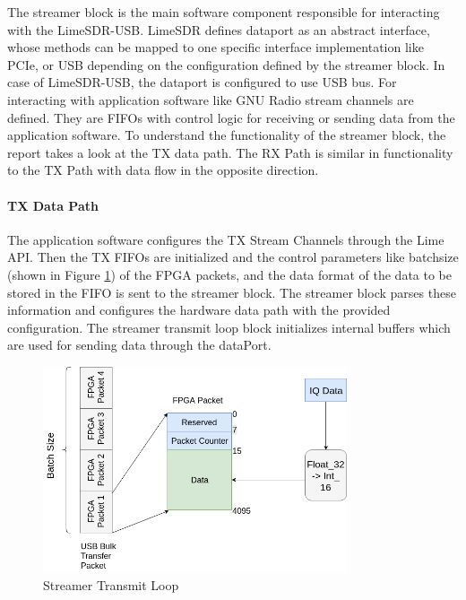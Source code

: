 The streamer block is the main software component responsible for interacting with the LimeSDR-USB.
LimeSDR defines dataport as an abstract interface, whose methods can be mapped to one specific interface implementation like \ac{PCIe}, or USB depending on the configuration defined by the streamer block.
In case of LimeSDR-USB, the dataport is configured to use \ac{USB} bus.
For interacting with application software like GNU Radio stream channels are defined.
They are FIFOs with control logic for receiving or sending data from the application software.
To understand the functionality of the streamer block, the report takes a look at the TX data path.
The RX Path is similar in functionality to the TX Path with data flow in the opposite direction.\\

\paragraph{TX Data Path} \label{TX Data Path} The application software configures the TX Stream Channels through the Lime \ac{API}. 
Then the TX FIFOs are initialized and the control parameters like batchsize (shown in Figure \ref{trans_loop}) of the \ac{FPGA} packets, and the data format of the data to be stored in the FIFO is sent to the streamer block.
The streamer block parses these information and configures the hardware data path with the provided configuration.
The streamer transmit loop block initializes internal buffers which are used for sending data through the dataPort.\\
\begin{figure}[h!]
\centering
\includegraphics[width=0.8\textwidth]{Figure/DriverHost.png}
\caption{Streamer Transmit Loop}
\label{trans_loop}
\end{figure}
 
